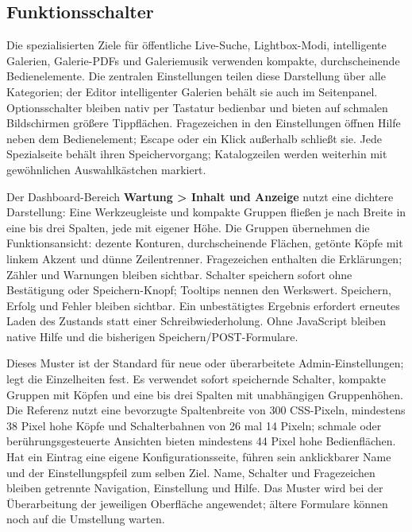 \documentclass[11pt,a4paper]{article}
\newcommand{\ui}[1]{\textbf{#1}}
\begin{document}
\subsection{Funktionsschalter}

Die spezialisierten Ziele für öffentliche Live-Suche, Lightbox-Modi,
intelligente
Galerien, Galerie-PDFs und Galeriemusik verwenden kompakte, durchscheinende
Bedienelemente. Die zentralen Einstellungen teilen diese Darstellung über alle
Kategorien; der Editor intelligenter Galerien behält sie auch im Seitenpanel.
Optionsschalter bleiben nativ per Tastatur bedienbar und bieten auf schmalen
Bildschirmen größere Tippflächen. Fragezeichen in den Einstellungen öffnen
Hilfe neben dem Bedienelement; Escape oder ein Klick außerhalb schließt sie.
Jede Spezialseite behält ihren Speichervorgang; Katalogzeilen werden weiterhin
mit gewöhnlichen Auswahlkästchen markiert.

Der Dashboard-Bereich \ui{Wartung > Inhalt und Anzeige} nutzt eine dichtere
Darstellung: Eine Werkzeugleiste und kompakte Gruppen fließen je nach
Breite in eine bis drei Spalten, jede mit eigener Höhe. Die Gruppen übernehmen
die Funktionsansicht: dezente Konturen, durchscheinende Flächen, getönte Köpfe
mit linkem Akzent und dünne Zeilentrenner. Fragezeichen enthalten
die Erklärungen; Zähler und Warnungen bleiben sichtbar. Schalter speichern
sofort ohne Bestätigung oder Speichern-Knopf; Tooltips nennen den Werkswert.
Speichern, Erfolg und Fehler bleiben sichtbar. Ein unbestätigtes Ergebnis
erfordert erneutes Laden des Zustands statt einer Schreibwiederholung.
Ohne JavaScript bleiben native Hilfe und die bisherigen
Speichern/POST-Formulare.

Dieses Muster ist der Standard für neue oder überarbeitete Admin-Einstellungen;
 legt die Einzelheiten fest. Es verwendet sofort
speichernde Schalter, kompakte Gruppen mit Köpfen und eine bis drei Spalten
mit unabhängigen Gruppenhöhen. Die Referenz nutzt eine bevorzugte Spaltenbreite
von 300 CSS-Pixeln, mindestens 38 Pixel hohe Köpfe und Schalterbahnen von
26 mal 14 Pixeln; schmale oder berührungsgesteuerte Ansichten bieten mindestens
44 Pixel hohe Bedienflächen. Hat ein Eintrag eine eigene Konfigurationsseite,
führen sein anklickbarer Name und der Einstellungspfeil zum selben Ziel.
Name, Schalter und Fragezeichen bleiben getrennte Navigation, Einstellung und
Hilfe. Das Muster wird bei der Überarbeitung der jeweiligen Oberfläche
angewendet; ältere Formulare können noch auf die Umstellung warten.
\end{document}
